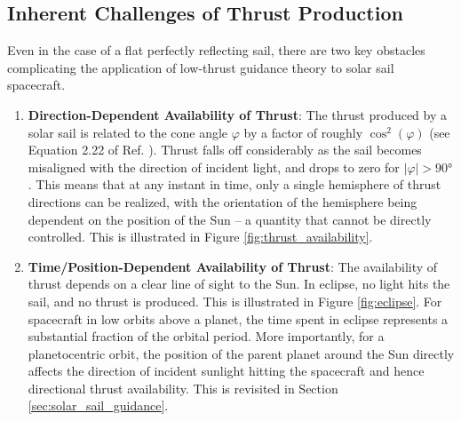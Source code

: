 \subsection{Inherent Challenges of Thrust Production}
Even in the case of a flat perfectly reflecting sail, there are two key obstacles complicating the application of low-thrust guidance theory to solar sail spacecraft.
\begin{enumerate}
  \item \textbf{Direction-Dependent Availability of Thrust}: The thrust produced by a solar sail is related to the cone angle \(\varphi\) by a factor of roughly \(\cos^2(\varphi)\) (see Equation 2.22 of Ref. \cite{mcinnes}). Thrust falls off considerably as the sail becomes misaligned with the direction of incident light, and drops to zero for \(|\varphi| > \ang{90}\). This means that at any instant in time, only a single hemisphere of thrust directions can be realized, with the orientation of the hemisphere being dependent on the position of the Sun -- a quantity that cannot be directly controlled. This is illustrated in Figure \ref{fig:thrust_availability}.
  \item \textbf{Time/Position-Dependent Availability of Thrust}: The availability of thrust depends on a clear line of sight to the Sun. In eclipse, no light hits the sail, and no thrust is produced. This is illustrated in Figure \ref{fig:eclipse}. For spacecraft in low orbits above a planet, the time spent in eclipse represents a substantial fraction of the orbital period. More importantly, for a planetocentric orbit, the position of the parent planet around the Sun directly affects the direction of incident sunlight hitting the spacecraft and hence directional thrust availability. This is revisited in Section \ref{sec:solar_sail_guidance}.
\end{enumerate}
